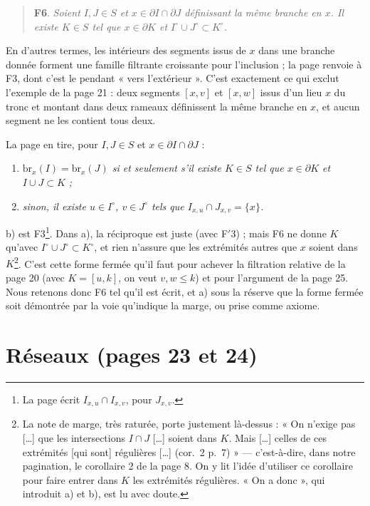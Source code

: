 \documentclass[11pt,a4paper]{article}
\begin{document}
\begin{quote}
\textbf{F6}. \emph{Soient $I, J \in S$ et $x \in \partial I \cap \partial J$
définissant la même branche en $x$. Il existe $K \in S$ tel que $x \in
\partial K$ et $I^{\circ} \cup J^{\circ} \subset K^{\circ}$.}
\end{quote}

En d'autres termes, les intérieurs des segments issus de $x$ dans une branche
donnée forment une famille filtrante croissante pour l'inclusion ; la page
renvoie à F3, dont c'est le pendant « vers l'extérieur ». C'est exactement ce
qui exclut l'exemple de la page 21 : deux segments $[x,v]$ et $[x,w]$ issus
d'un lieu $x$ du tronc et montant dans deux rameaux définissent la même
branche en $x$, et aucun segment ne les contient tous deux.

La page en tire, pour $I, J \in S$ et $x \in \partial I \cap \partial J$ :
\begin{enumerate}
\item[a)] \emph{$\mathrm{br}_{x}(I) = \mathrm{br}_{x}(J)$ si et seulement s'il
existe $K \in S$ tel que $x \in \partial K$ et $I \cup J \subset K$ ;}
\item[b)] \emph{sinon, il existe $u \in I^{\circ}$, $v \in J^{\circ}$ tels que
$I_{x,u} \cap J_{x,v} = \{x\}$.}
\end{enumerate}

b) est F3\footnote{La page écrit $I_{x,u} \cap I_{x,v}$, pour $J_{x,v}$.}. Dans
a), la réciproque est juste (avec F$'$3) ; mais F6 ne donne $K$ qu'avec
$I^{\circ} \cup J^{\circ} \subset K^{\circ}$, et rien n'assure que les
extrémités autres que $x$ soient dans $K$\footnote{La note de marge, très
raturée, porte justement là-dessus : « On n'exige pas [\dots] que les
intersections $I \cap J$ [\dots] soient dans $K$. Mais [\dots] celles de ces
extrémités [qui sont] régulières [\dots] (cor.~2 p.~7) » --- c'est-à-dire,
dans notre pagination, le corollaire 2 de la page 8. On y lit l'idée
d'utiliser ce corollaire pour faire entrer dans $K$ les extrémités régulières.
« On a donc », qui introduit a) et b), est lu avec doute.}. C'est cette forme
fermée qu'il faut pour achever la filtration relative de la page 20 (avec $K
= [u,k]$, on veut $v, w \leq k$) et pour l'argument de la page 25. Nous
retenons donc F6 tel qu'il est écrit, et a) sous la réserve que la forme
fermée soit démontrée par la voie qu'indique la marge, ou prise comme axiome.

\section*{Réseaux (pages 23 et 24)}
\end{document}
